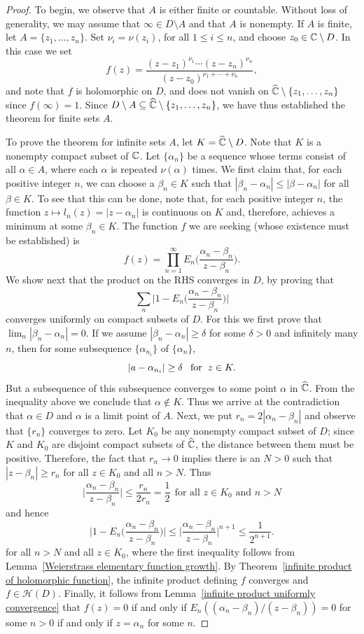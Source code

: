 \begin{proof}
To begin, we observe that $A$ is either finite or countable. Without loss of generality, we may assume that $\infty\in D\setminus A$ and that $A$ is nonempty. If $A$ is finite, let $A=\{z_1,\dots,z_n\}$. Set $\nu_i=\nu(z_i)$, for all $1\leq i\leq n$, and choose $z_0\in\mathbb{C}\setminus D$. In this case we set
\[f(z)=\frac{(z-z_1)^{\nu_1}\cdots(z-z_n)^{\nu_n}}{(z-z_0)^{\nu_1+\cdots+\nu_n}},\]
and note that $f$ is holomorphic on $D$, and does not vanish on $\widehat{\mathbb{C}}\setminus\{z_1,\dots,z_n\}$ since $f(\infty)=1$. Since $D\setminus
A\subseteq\widehat{\mathbb{C}}\setminus\{z_1,\dots,z_n\}$, we have thus established the theorem for finite sets $A$.\par
To prove the theorem for infinite sets $A$, let $K=\widehat{\mathbb{C}}\setminus D$. Note that $K$ is a nonempty compact subset of $\mathbb{C}$. Let $\{\alpha_n\}$ be a sequence whose terms consist of all $\alpha\in A$, where each $\alpha$ is repeated $\nu(\alpha)$ times. We first claim that, for each positive integer $n$, we can choose a $\beta_n\in K$ such that $|\beta_n-\alpha_n|\leq|\beta-\alpha_n|$ for all $\beta\in K$. To see that this can be done, note that, for each positive integer $n$, the function $z\mapsto l_n(z)=|z-\alpha_n|$ is continuous on $K$ and, therefore, achieves a minimum at some $\beta_n\in K$. The function $f$ we are seeking (whose existence must be established) is
\[f(z)=\prod_{n=1}^{\infty}E_n\Big(\frac{\alpha_n-\beta_n}{z-\beta_n}\Big).\]
We show next that the product on the RHS converges in $D$, by proving that 
\[\sum_n\Big|1-E_n\Big(\frac{\alpha_n-\beta_n}{z-\beta_n}\Big)\Big|\]
converges uniformly on compact subsets of $D$. For this we first prove that $\lim_n|\beta_n-\alpha_n|=0$. If we assume $|\beta_n-\alpha_n|\geq\delta$ for some $\delta>0$ and infinitely many $n$, then for some subsequence $\{\alpha_{n_i}\}$ of $\{\alpha_n\}$, 
\[|a-\alpha_{n_i}|\geq\delta\hspace{8pt}\text{for}\hspace{6pt} z\in K.\]
But a subsequence of this subsequence converges to some point $\alpha$ in $\widehat{\mathbb{C}}$. From the inequality above we conclude that $\alpha\notin K$. Thus we arrive at the contradiction that $\alpha\in D$ and $\alpha$ is a limit point of $A$. Next, we put $r_n=2|\alpha_n-\beta_n|$ and observe that $\{r_n\}$ converges to zero. Let $K_0$ be any nonempty compact subset of $D$; since $K$ and $K_0$ are disjoint compact subsets of $\widehat{\mathbb{C}}$, the distance between them must be positive. Therefore, the fact that $r_n\to 0$ implies there is an $N>0$ such that $|z-\beta_n|\geq r_n$ for all $z\in K_0$ and all $n>N$. Thus
\[\Big|\frac{\alpha_n-\beta_n}{z-\beta_n}\Big|\leq\frac{r_n}{2r_n}=\frac{1}{2}\ \ \text{for all $z\in K_0$ and $n>N$}\]
and hence
\[\Big|1-E_n\Big(\frac{\alpha_n-\beta_n}{z-\beta_n}\Big)\Big|\leq\Big|\frac{\alpha_n-\beta_n}{z-\beta_n}\Big|^{n+1}\leq\frac{1}{2^{n+1}}.\]
for all $n>N$ and all $z\in K_0$, where the first inequality follows from Lemma~\ref{Weierstrass elementary function growth}. By Theorem~\ref{infinite product of holomorphic function}, the infinite product defining $f$ converges and $f\in\mathcal{H}(D)$. Finally, it follows from Lemma~\ref{infinite product uniformly convergence} that $f(z)=0$ if and only if $E_n((\alpha_n-\beta_n)/(z-\beta_n))=0$ for some $n>0$ if and only if $z=\alpha_n$ for some $n$.
\end{proof}
